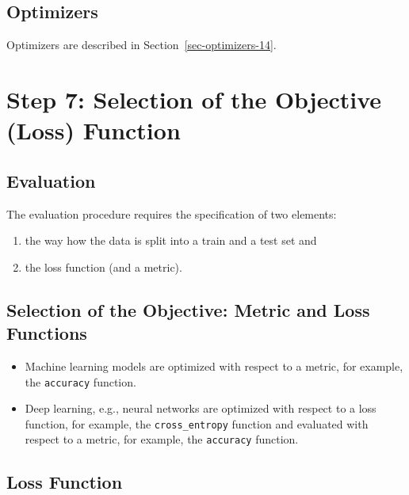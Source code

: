 \documentclass[
  letterpaper,
  DIV=11,
  numbers=noendperiod]{scrreprt}
\providecommand{\tightlist}{%
  \setlength{\itemsep}{0pt}\setlength{\parskip}{0pt}}\usepackage{longtable,booktabs,array}
\begin{document}
\hypertarget{sec-optimizers-17}{%
\subsection{Optimizers}\label{sec-optimizers-17}}

Optimizers are described in Section~\ref{sec-optimizers-14}.

\hypertarget{step-7-selection-of-the-objective-loss-function-3}{%
\section{Step 7: Selection of the Objective (Loss)
Function}\label{step-7-selection-of-the-objective-loss-function-3}}

\hypertarget{evaluation}{%
\subsection{Evaluation}\label{evaluation}}

The evaluation procedure requires the specification of two elements:

\begin{enumerate}
\def\labelenumi{\arabic{enumi}.}
\tightlist
\item
  the way how the data is split into a train and a test set and
\item
  the loss function (and a metric).
\end{enumerate}

\hypertarget{selection-of-the-objective-metric-and-loss-functions-1}{%
\subsection{Selection of the Objective: Metric and Loss
Functions}\label{selection-of-the-objective-metric-and-loss-functions-1}}

\begin{itemize}
\tightlist
\item
  Machine learning models are optimized with respect to a metric, for
  example, the \texttt{accuracy} function.
\item
  Deep learning, e.g., neural networks are optimized with respect to a
  loss function, for example, the \texttt{cross\_entropy} function and
  evaluated with respect to a metric, for example, the \texttt{accuracy}
  function.
\end{itemize}

\hypertarget{loss-function}{%
\subsection{Loss Function}\label{loss-function}}
\end{document}
